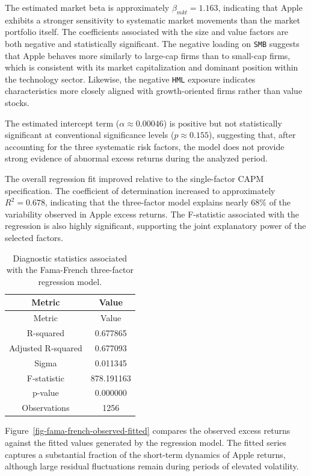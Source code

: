 \documentclass[
  12pt,
  letterpaper,
]{book}
\begin{document}
The estimated market beta is approximately \(\beta_{mkt} = 1.163\),
indicating that Apple exhibits a stronger sensitivity to systematic
market movements than the market portfolio itself. The coefficients
associated with the size and value factors are both negative and
statistically significant. The negative loading on \texttt{SMB} suggests
that Apple behaves more similarly to large-cap firms than to small-cap
firms, which is consistent with its market capitalization and dominant
position within the technology sector. Likewise, the negative
\texttt{HML} exposure indicates characteristics more closely aligned
with growth-oriented firms rather than value stocks.

The estimated intercept term (\(\alpha \approx 0.00046\)) is positive
but not statistically significant at conventional significance levels
(\(p \approx 0.155\)), suggesting that, after accounting for the three
systematic risk factors, the model does not provide strong evidence of
abnormal excess returns during the analyzed period.

The overall regression fit improved relative to the single-factor CAPM
specification. The coefficient of determination increased to
approximately \(R^2 = 0.678\), indicating that the three-factor model
explains nearly \(68\%\) of the variability observed in Apple excess
returns. The F-statistic associated with the regression is also highly
significant, supporting the joint explanatory power of the selected
factors.

\begin{longtable}[]{@{}cc@{}}
\caption{Diagnostic statistics associated with the Fama-French
three-factor regression
model.}\label{tbl-ff3-diagnostics}\tabularnewline
\toprule\noalign{}
Metric & Value \\
\midrule\noalign{}
\endfirsthead
\toprule\noalign{}
Metric & Value \\
\midrule\noalign{}
\endhead
\bottomrule\noalign{}
\endlastfoot
R-squared & 0.677865 \\
Adjusted R-squared & 0.677093 \\
Sigma & 0.011345 \\
F-statistic & 878.191163 \\
p-value & 0.000000 \\
Observations & 1256 \\
\end{longtable}

Figure~\ref{fig-fama-french-observed-fitted} compares the observed
excess returns against the fitted values generated by the regression
model. The fitted series captures a substantial fraction of the
short-term dynamics of Apple returns, although large residual
fluctuations remain during periods of elevated volatility.
\end{document}
